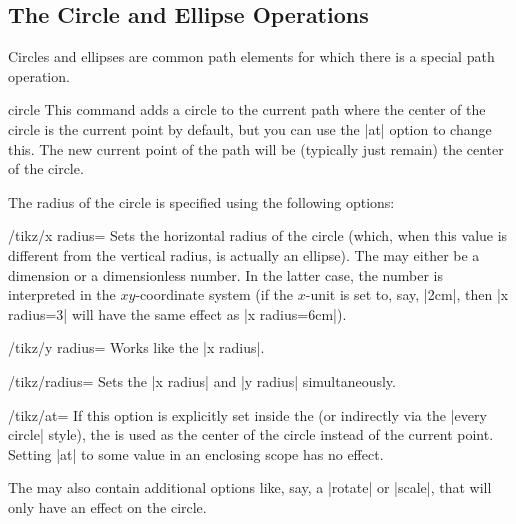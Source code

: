 \subsection{The Circle and Ellipse Operations}

Circles and ellipses are common path elements for which there is a special path
operation.

\begin{pathoperation}{circle}{}
    This command adds a circle to the current path where the center of the
    circle is the current point by default, but you can use the |at| option to
    change this. The new current point of the path will be (typically just
    remain) the center of the circle.

    The radius of the circle is specified using the following options:
    \begin{key}{/tikz/x radius=}
        Sets the horizontal radius of the circle (which, when this value is
        different from the vertical radius, is actually an ellipse). The
         may either be a dimension or a dimensionless number. In
        the latter case, the number is interpreted in the $xy$-coordinate
        system (if the $x$-unit is set to, say, |2cm|, then |x radius=3| will
        have the same effect as |x radius=6cm|).
    \end{key}
    \begin{key}{/tikz/y radius=}
        Works like the |x radius|.
    \end{key}
    \begin{key}{/tikz/radius=}
        Sets the |x radius| and |y radius| simultaneously.
    \end{key}
    \begin{key}{/tikz/at=}
        If this option is explicitly set inside the  (or
        indirectly via the |every circle| style), the  is used
        as the center of the circle instead of the current point. Setting |at|
        to some value in an enclosing scope has no effect.
    \end{key}
    The  may also contain additional options like, say, a
    |rotate| or |scale|, that will only have an effect on the circle.
\begin{codeexample}[]
\end{codeexample}


\end{pathoperation}
